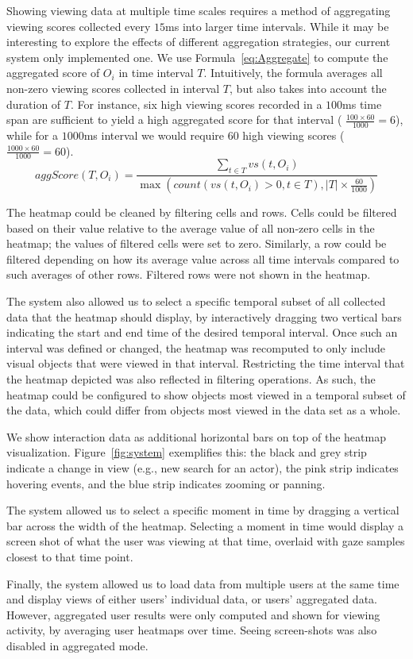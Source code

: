 Showing viewing data at multiple time scales requires a method of aggregating viewing scores collected every $15$ms into larger time intervals. While it may be interesting to explore the effects of different aggregation strategies, our current system only implemented one. We use Formula~\ref{eq:Aggregate} to compute the aggregated score of $O_i$ in time interval $T$. Intuitively, the formula averages all non-zero viewing scores collected in interval $T$, but also takes into account the duration of $T$. For instance, six high viewing scores recorded in a $100$ms time span are sufficient to yield a high aggregated score for that interval ( $\frac{100 \times 60 }{1000} = 6$), while for a $1000$ms interval we would require $60$ high viewing scores ( $\frac{1000 \times 60 }{1000} = 60$).
\begin{equation}
aggScore(T,O_i) = \frac{\displaystyle\sum_{t \in T }{vs(t, O_i)}}{\max (count(vs(t, O_i) > 0 , t \in T),|T| \times \frac{60}{1000}) }
\label{eq:Aggregate}
\end{equation}

The heatmap could be cleaned by filtering cells and rows. Cells could be filtered based on their value relative to the average value of all non-zero cells in the heatmap; the values of filtered cells were set to zero. Similarly, a row could be filtered depending on how its average value across all time intervals compared to such averages of other rows. Filtered rows were not shown in the heatmap. 

The system also allowed us to select a specific temporal subset of all collected data that the heatmap should display, by interactively dragging two vertical bars indicating the start and end time of the desired temporal interval. Once such an interval was defined or changed, the heatmap was recomputed to only include visual objects that were viewed in that interval. Restricting the time interval that the heatmap depicted was also reflected in filtering operations. As such, the heatmap could be configured to show objects most viewed in a temporal subset of the data, which could differ from objects most viewed in the data set as a whole.

We show interaction data as additional horizontal bars on top of the heatmap visualization. Figure~\ref{fig:system} exemplifies this: the black and grey strip indicate a change in view (e.g., new search for an actor), the pink strip indicates hovering events, and the blue strip indicates zooming or panning. 

The system allowed us to select a specific moment in time by dragging a vertical bar across the width of the heatmap. Selecting a moment in time would display a screen shot of what the user was viewing at that time, overlaid with gaze samples closest to that time point. 

Finally, the system allowed us to load data from multiple users at the same time and display views of either users' individual data, or users' aggregated data. However, aggregated user results were only computed and shown for viewing activity, by averaging user heatmaps over time. Seeing screen-shots was also disabled in aggregated mode.
